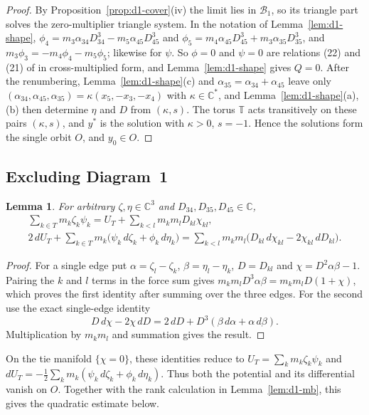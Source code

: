 \documentclass[11pt]{amsart}
\newtheorem{lemma}[theorem]{Lemma}
\theoremstyle{definition}
\theoremstyle{remark}
\newcommand{\C}{\mathbb{C}}
\begin{document}
\begin{proof}
By Proposition~\ref{prop:d1-cover}(iv) the limit lies in $\mathcal B_1$, so its triangle part
solves the zero-multiplier triangle system.  In the notation of Lemma~\ref{lem:d1-shape},
$\phi_4=m_3\alpha_{34}D_{34}^3-m_5\alpha_{45}D_{45}^3$ and
$\phi_5=m_4\alpha_{45}D_{45}^3+m_3\alpha_{35}D_{35}^3$, and $m_3\phi_3=-m_4\phi_4-m_5\phi_5$;
likewise for $\psi$.  So $\phi=0$ and $\psi=0$ are relations (22) and (21) of \cite[\S8.1]{AK} in
cross-multiplied form, and Lemma~\ref{lem:d1-shape} gives $Q=0$.
After the renumbering, Lemma~\ref{lem:d1-shape}(c) and $\alpha_{35}=\alpha_{34}+\alpha_{45}$
leave only $(\alpha_{34},\alpha_{45},\alpha_{35})=\kappa(x_5,-x_3,-x_4)$ with $\kappa\in\C^*$, and
Lemma~\ref{lem:d1-shape}(a),(b) then determine $\eta$ and $D$ from $(\kappa,s)$.  The torus
$\mathbb T$ acts transitively on these pairs $(\kappa,s)$, and $y^*$ is the solution with
$\kappa>0$, $s=-1$.  Hence the solutions form the single orbit $O$, and $y_0\in O$.
\end{proof}

\subsection{Excluding Diagram~1}

{\begin{lemma}\label{lem:d1-virial}
For arbitrary $\zeta,\eta\in\C^3$ and $D_{34},D_{35},D_{45}\in\C$,
\begin{gather*}
  \sum_{k\in T}m_k\zeta_k\psi_k=U_T+\sum_{k<l}m_km_lD_{kl}\chi_{kl},\\
  2\,dU_T+\sum_{k\in T}m_k\big(\psi_k\,d\zeta_k+\phi_k\,d\eta_k\big)
  =\sum_{k<l}m_km_l\big(D_{kl}\,d\chi_{kl}-2\chi_{kl}\,dD_{kl}\big).
\end{gather*}
\end{lemma}}
{\begin{proof}
For a single edge put $\alpha=\zeta_l-\zeta_k$,
$\beta=\eta_l-\eta_k$, $D=D_{kl}$ and $\chi=D^2\alpha\beta-1$.
Pairing the $k$ and $l$ terms in the force sum gives
$m_km_lD^3\alpha\beta=m_km_lD(1+\chi)$, which proves the first identity
after summing over the three edges.  For the second use the exact
single-edge identity
\[
 D\,d\chi-2\chi\,dD
       =2\,dD+D^3(\beta\,d\alpha+\alpha\,d\beta).
\]
Multiplication by $m_km_l$ and summation gives the result.
\end{proof}

}{On the tie manifold $\{\chi=0\}$, these identities reduce to
$U_T=\sum_km_k\zeta_k\psi_k$ and
$dU_T=-\frac12\sum_km_k(\psi_k\,d\zeta_k+\phi_k\,d\eta_k)$.
Thus both the potential and its differential vanish on $O$.  Together with the rank
calculation in Lemma~\ref{lem:d1-mb}, this gives the quadratic estimate below.}
\end{document}
